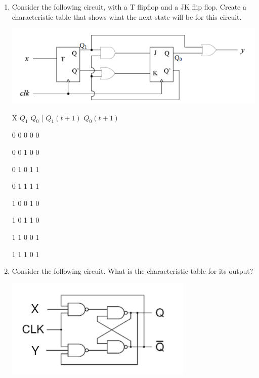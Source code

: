 \documentclass[10pt]{article}
\begin{document}
\begin{itemize}
\begin{enumerate}
\item Consider the following circuit, with a T flipflop and a JK flip flop.  Create a characteristic table that shows what the next state will be for this circuit. 

\includegraphics[scale=.8]{ExampleFFProblem.png}

X $Q_1$  $Q_0$ | $Q_1(t+1)$  $Q_0(t+1)$

0      0         0   \hspace{2cm}          0                0

0      0         1      \hspace{2cm}       0                0

0      1         0       \hspace{2cm}      1                1

0      1         1        \hspace{2cm}     1                1

1      0         0    \hspace{2cm}         1                0

1      0         1     \hspace{2cm}        1                0

1      1         0      \hspace{2cm}       0                1

1      1         1      \hspace{2cm}       0                1

\item Consider the following circuit.  What is the characteristic table for its output?

\includegraphics[scale=.8]{FlipFlopBehaviourProblemWithLabels.png}


\end{enumerate}
\end{itemize}
\end{document}
